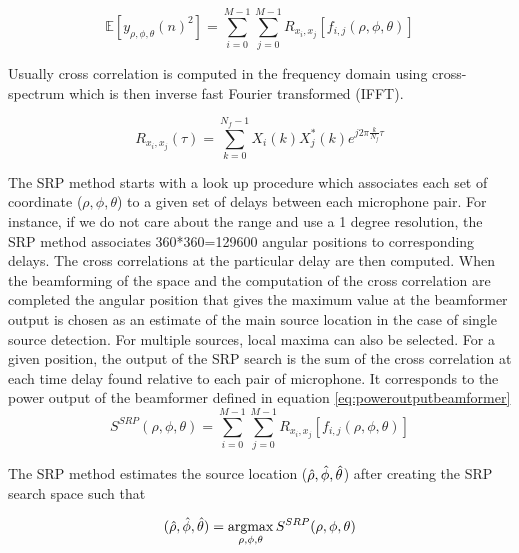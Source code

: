\begin{equation}
    \mathbb{E}[{y_{\rho,\phi,\theta}(n)^2}]=\sum\limits_{i=0}^{M-1}\sum\limits_{j=0}^{M-1}{R_{x_i,x_j}[f_{i,j}(\rho,\phi,\theta)]} 
    \label{eq:poweroutputbeamformer}
\end{equation}

Usually cross correlation is computed in the frequency domain using cross-spectrum which is then inverse fast Fourier transformed (IFFT).

\begin{equation}
    R_{x_i,x_j}(\tau)= \sum\limits_{k=0}^{N_{f}-1}{X_{i}(k)X_{j}^*(k)e^{j2\pi\frac{k}{N_{f}}\tau}}
\end{equation}


The SRP method starts with a look up procedure which associates each set of coordinate ($\rho,\phi,\theta$) to a given set of delays between each microphone pair. For instance, if we do not care about the range and use a 1 degree resolution, the SRP method associates 360*360=129600 angular positions to corresponding delays. The cross correlations at the particular delay are then computed. When the beamforming of the space and the computation of the cross correlation are completed the angular position that gives the maximum value at the beamformer output is chosen as an estimate of the main source location in the case of single source detection. For multiple sources, local maxima can also be selected. For a given position, the output of the SRP search is the sum of the cross correlation at each time delay found relative to each pair of microphone. It corresponds to the power output of the beamformer defined in equation \ref{eq:poweroutputbeamformer}
\begin{equation}
    S^{SRP}(\rho,\phi,\theta)=\sum\limits_{i=0}^{M-1}\sum\limits_{j=0}^{M-1}{R_{x_i,x_j}[f_{i,j}(\rho,\phi,\theta)]}
\end{equation}

The SRP method estimates the source location ($\Hat{\rho},\hat{\phi},\hat{\theta}$) after creating the SRP search space such that

\begin{equation}
    (\Hat{\rho},\hat{\phi},\hat{\theta})=\argmax_{\rho,\phi,\theta}S^{SRP}(\rho,\phi,\theta)
\end{equation}

